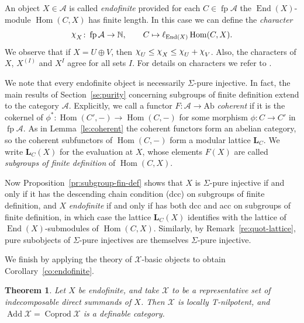 \documentclass[a4paper]{amsart}
\theoremstyle{plain}
\newtheorem{thm}{Theorem}[section]
\theoremstyle{definition}
\theoremstyle{remark}
\numberwithin{equation}{section}
\newcommand{\Add}{\operatorname{Add}}
\newcommand{\Coprod}{\operatorname{Coprod}}
\newcommand{\End}{\operatorname{End}}
\newcommand{\fp}{\operatorname{fp}}
\newcommand{\Hom}{\operatorname{Hom}}
\newcommand{\Ab}{\mathrm{Ab}}
\newcommand{\character}{\raisebox{1pt}[0pt][2pt]{$\chi$}}
\def\A{\mathcal A}
\def\X{\mathcal X}
\def\bfL{\mathbf L}
\def\bfL{\mathbf L}
\def\bbN{\mathbb N}
\begin{document}
An object $X\in\A$ is called \emph{endofinite} provided for each $C\in\fp\A$ the $\End(X)$-module $\Hom(C,X)$ has finite length.  In this case we can define the \emph{character}
\[ \character_X \colon \fp\A \to \bbN, \qquad C \mapsto \ell_{\End(X)}\Hom(C,X). \]
We observe that if $X=U\oplus V$, then $\character_U\leq\character_X\leq\character_U+\character_V$. Also, the characters of $X$, $X^{(I)}$ and $X^I$ agree for all sets $I$. For details on characters we refer to \cite{CB3}.

We note that every endofinite object is necessarily $\Sigma$-pure injective. In fact, the main results of Section~\ref{se:purity} concerning subgroups of finite definition extend to the category $\A$. Explicitly, we call a functor $F\colon\A\to\Ab$ \emph{coherent} if it is the cokernel of $\phi^\ast\colon\Hom(C',-)\to\Hom(C,-)$ for some morphism $\phi\colon C\to C'$ in $\fp\A$. As in Lemma~\ref{le:coherent} the coherent functors form an abelian category, so the coherent subfunctors of $\Hom(C,-)$ form a modular lattice $\bfL_C$. We write $\bfL_C(X)$ for the evaluation at $X$, whose elements $F(X)$ are called \emph{subgroups of finite definition} of $\Hom(C,X)$.

Now Proposition~\ref{pr:subgroup-fin-def} shows that $X$ is $\Sigma$-pure injective if and only if it has the descending chain condition (dcc) on subgroups of finite definition, and $X$ \emph{endofinite} if and only if has both dcc and acc on subgroups of finite definition, in which case the lattice $\bfL_C(X)$ identifies with the lattice of $\End(X)$-submodules of $\Hom(C,X)$. Similarly, by Remark~\ref{re:quot-lattice}, pure subobjects of $\Sigma$-pure injectives are themselves $\Sigma$-pure injective.

We finish by applying the theory of $\X$-basic objects to obtain Corollary~\ref{co:endofinite}.

\begin{thm}\label{th:endofinite-definable}
Let $X$ be endofinite, and take $\X$ to be a representative set of indecomposable direct summands of $X$. Then $\X$ is locally T-nilpotent, and $\Add\X=\Coprod\X$ is a definable category.
\end{thm}
\end{document}

